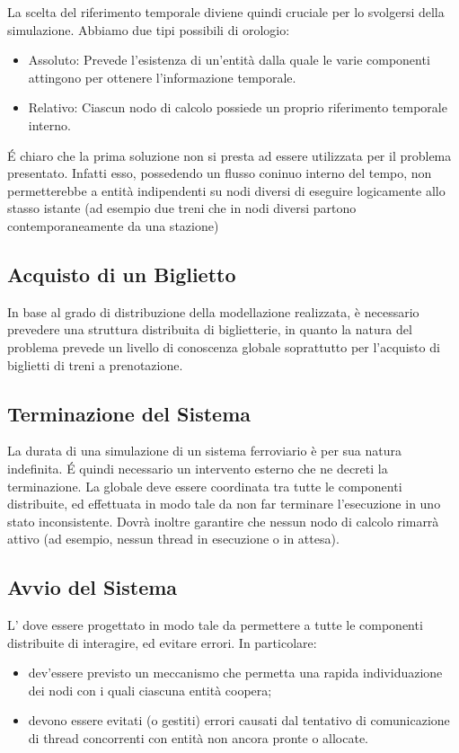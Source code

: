 	La scelta del riferimento temporale diviene quindi cruciale per lo svolgersi della simulazione. Abbiamo due tipi possibili di orologio:
		\begin{itemize}
			\item Assoluto: Prevede l'esistenza di un'entità dalla quale le varie componenti attingono per ottenere l'informazione temporale. 
			\item Relativo: Ciascun nodo di calcolo possiede un proprio riferimento temporale interno.
		\end{itemize}
		
	\'E chiaro che la prima soluzione non si presta ad essere utilizzata per il problema presentato. Infatti esso, possedendo un flusso coninuo interno del tempo, non permetterebbe a entità indipendenti su nodi diversi di eseguire logicamente allo stasso istante (ad esempio due treni che in nodi diversi partono contemporaneamente da una stazione)

	\subsection{Acquisto di un Biglietto}
	
	In base al grado di distribuzione della modellazione realizzata, è necessario prevedere una struttura distribuita di biglietterie, in quanto la natura del problema prevede un livello di conoscenza globale soprattutto per l'acquisto di biglietti di treni a prenotazione.

	\subsection{Terminazione del Sistema}
	
	La durata di una simulazione di un sistema ferroviario è per sua natura indefinita. \'E quindi necessario un intervento esterno che ne decreti la terminazione.	La  globale deve essere coordinata tra tutte le componenti distribuite, ed effettuata in modo tale da non far terminare l'esecuzione in uno stato inconsistente. Dovrà inoltre garantire che nessun nodo di calcolo rimarrà attivo (ad esempio, nessun thread in esecuzione o in attesa).

	\subsection{Avvio del Sistema}
	
	L' dove essere progettato in modo tale da permettere a tutte le componenti distribuite di interagire, ed evitare errori. In particolare:
	\begin{itemize}
		\item dev'essere previsto un meccanismo che permetta una rapida individuazione dei nodi con i quali ciascuna entità coopera;
		\item devono essere evitati (o gestiti) errori causati dal tentativo di comunicazione di thread concorrenti con entità non ancora pronte o allocate.
	\end{itemize} 
	

